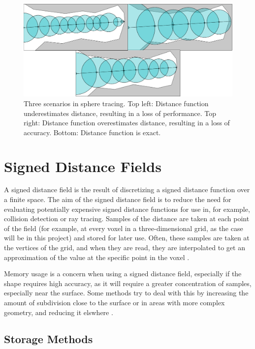 \begin{figure} [ht]
	\centering
	\includegraphics[width=0.75\linewidth, frame]{Images/Sphere-Tracing.png}
	\caption{Three scenarios in sphere tracing. Top left: Distance function underestimates distance, resulting in a loss of performance. Top right: Distance function overestimates distance, resulting in a loss of accuracy. Bottom: Distance function is exact.}
	\label{figure:sphere-tracing}
\end{figure}

\section{Signed Distance Fields}

A signed distance field is the result of discretizing a signed distance function over a finite space. The aim of the signed distance field is to reduce the need for evaluating potentially expensive signed distance functions for use in, for example, collision detection or ray tracing. Samples of the distance are taken at each point of the field (for example, at every voxel in a three-dimensional grid, as the case will be in this project) and stored for later use. Often, these samples are taken at the vertices of the grid, and when they are read, they are interpolated to get an approximation of the value at the specific point in the voxel \cite{koschier2016hierarchical}.\newline

Memory usage is a concern when using a signed distance field, especially if the shape requires high accuracy, as it will require a greater concentration of samples, especially near the surface. Some methods try to deal with this by increasing the amount of subdivision close to the surface or in areas with more complex geometry, and reducing it elswhere \cite{frisken2000adaptively}.

\subsection{Storage Methods}

